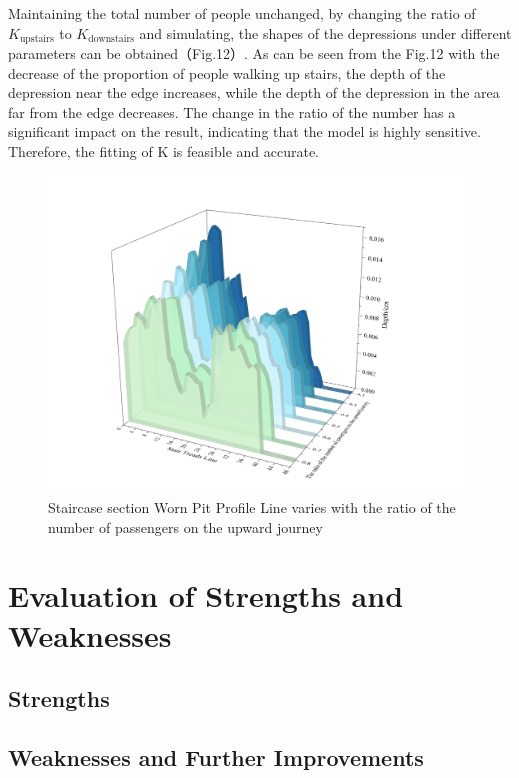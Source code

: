 \documentclass{mcmthesis}
\begin{document}
Maintaining the total number of people unchanged, by changing the ratio of $K_{\text{upstairs}}$ to $K_{\text{downstairs}}$ and simulating, the shapes of the depressions under different parameters can be obtained（Fig.12）.
As can be seen from the Fig.12 with the decrease of the proportion of people walking up stairs, the depth of the depression near the edge increases, while the depth of the depression in the area far from the edge decreases. The change in the ratio of the number has a significant impact on the result, indicating that the model is highly sensitive. Therefore, the fitting of K is feasible and accurate.

\begin{figure}[h]  %
  \small
  \centering  %
  \includegraphics[width=11cm]{14-Staircase section Worn Pit Profile Line varies with the ratio of the number of passengers on the upward journey..png}
  \caption{Staircase section Worn Pit Profile Line varies with the ratio of the number of passengers on the upward journey} \label{fig:2}  %
  \end{figure}  %
\section{ Evaluation of Strengths and Weaknesses}%
\subsection{Strengths}
\subsection{Weaknesses and Further Improvements}
\end{document}
